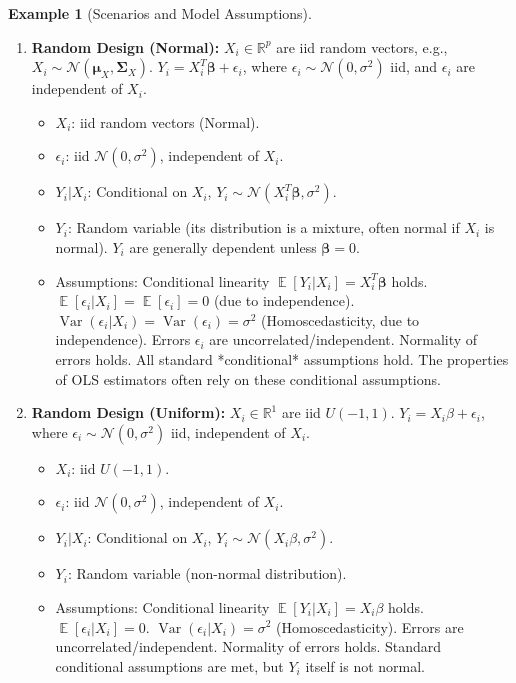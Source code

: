 \documentclass[11pt]{article}
\theoremstyle{definition}
\newtheorem{example}[theorem]{Example}
\theoremstyle{remark}
\DeclareMathOperator{\E}{\mathbb{E}}
\DeclareMathOperator{\Var}{\operatorname{Var}}
\begin{document}
\begin{example}[Scenarios and Model Assumptions]
\begin{enumerate}
        \item \textbf{Random Design (Normal):} $X_i \in \mathbb{R}^p$ are iid random vectors, e.g., $X_i \sim \mathcal{N}(\bm{\mu}_X, \bm{\Sigma}_X)$. $Y_i = X_i^T \bm{\beta} + \epsilon_i$, where $\epsilon_i \sim \mathcal{N}(0, \sigma^2)$ iid, and $\epsilon_i$ are independent of $X_i$.
            \begin{itemize}
                \item $X_i$: iid random vectors (Normal).
                \item $\epsilon_i$: iid $\mathcal{N}(0, \sigma^2)$, independent of $X_i$.
                \item $Y_i | X_i$: Conditional on $X_i$, $Y_i \sim \mathcal{N}(X_i^T \bm{\beta}, \sigma^2)$.
                \item $Y_i$: Random variable (its distribution is a mixture, often normal if $X_i$ is normal). $Y_i$ are generally dependent unless $\bm{\beta}=0$.
                \item Assumptions: Conditional linearity $\E[Y_i|X_i] = X_i^T\bm{\beta}$ holds. $\E[\epsilon_i|X_i] = \E[\epsilon_i] = 0$ (due to independence). $\Var(\epsilon_i|X_i) = \Var(\epsilon_i) = \sigma^2$ (Homoscedasticity, due to independence). Errors $\epsilon_i$ are uncorrelated/independent. Normality of errors holds. All standard *conditional* assumptions hold. The properties of OLS estimators often rely on these conditional assumptions.
            \end{itemize}
            
        \item \textbf{Random Design (Uniform):} $X_i \in \mathbb{R}^1$ are iid $U(-1, 1)$. $Y_i = X_i \beta + \epsilon_i$, where $\epsilon_i \sim \mathcal{N}(0, \sigma^2)$ iid, independent of $X_i$.
            \begin{itemize}
                \item $X_i$: iid $U(-1, 1)$.
                \item $\epsilon_i$: iid $\mathcal{N}(0, \sigma^2)$, independent of $X_i$.
                \item $Y_i | X_i$: Conditional on $X_i$, $Y_i \sim \mathcal{N}(X_i \beta, \sigma^2)$.
                \item $Y_i$: Random variable (non-normal distribution).
                \item Assumptions: Conditional linearity $\E[Y_i|X_i] = X_i \beta$ holds. $\E[\epsilon_i|X_i] = 0$. $\Var(\epsilon_i|X_i) = \sigma^2$ (Homoscedasticity). Errors are uncorrelated/independent. Normality of errors holds. Standard conditional assumptions are met, but $Y_i$ itself is not normal.
            \end{itemize}
            

\end{enumerate}
\end{example}
\end{document}
